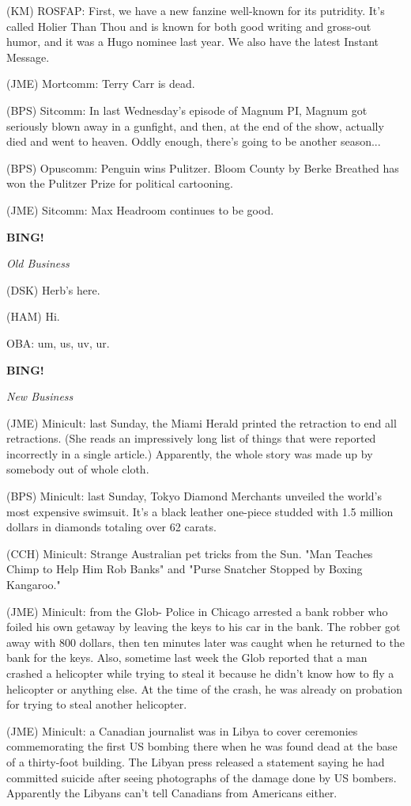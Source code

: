 \documentclass[12pt]{article}
\newcommand{\bing}{{\bf BING!} }
\newcommand{\goto}[1]{\bing \vskip 12pt \centerline{{\em{#1}}}}
\begin{document}
(KM) ROSFAP: First, we have a new fanzine well-known for its putridity. It's called Holier Than Thou and is known for both good writing and gross-out humor, and it was a Hugo nominee last year. We also have the latest Instant Message.

(JME) Mortcomm: Terry Carr is dead.

(BPS) Sitcomm: In last Wednesday's episode of Magnum PI, Magnum got seriously blown away in a gunfight, and then, at the end of the show, actually died and went to heaven. Oddly enough, there's going to be another season...

(BPS) Opuscomm: Penguin wins Pulitzer. Bloom County by Berke Breathed has won the Pulitzer Prize for political cartooning.

(JME) Sitcomm: Max Headroom continues to be good.

\goto{Old Business}

(DSK) Herb's here.

(HAM) Hi.

OBA: um, us, uv, ur.

\goto{New Business}

(JME) Minicult: last Sunday, the Miami Herald printed the retraction to end all retractions. (She reads an impressively long list of things that were reported incorrectly in a single article.) Apparently, the whole story was made up by somebody out of whole cloth.

(BPS) Minicult: last Sunday, Tokyo Diamond Merchants unveiled the world's most expensive swimsuit. It's a black leather one-piece studded with 1.5 million dollars in diamonds totaling over 62 carats.

(CCH) Minicult: Strange Australian pet tricks from the Sun. "Man Teaches Chimp to Help Him Rob Banks" and "Purse Snatcher Stopped by Boxing Kangaroo."

(JME) Minicult: from the Glob- Police in Chicago arrested a bank robber who foiled his own getaway by leaving the keys to his car in the bank. The robber got away with 800 dollars, then ten minutes later was caught when he returned to the bank for the keys. Also, sometime last week the Glob reported that a man crashed a helicopter while trying to steal it because he didn't know how to fly a helicopter or anything else. At the time of the crash, he was already on probation for trying to steal another helicopter.

(JME) Minicult: a Canadian journalist was in Libya to cover ceremonies commemorating the first US bombing there when he was found dead at the base of a thirty-foot building. The Libyan press released a statement saying he had committed suicide after seeing photographs of the damage done by US bombers. Apparently the Libyans can't tell Canadians from Americans either.
\end{document}
